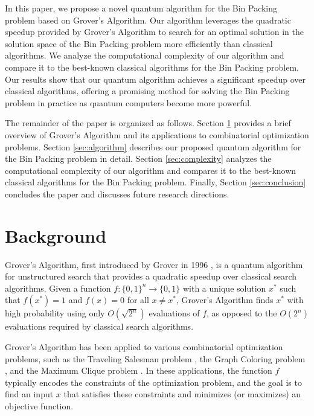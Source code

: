 In this paper, we propose a novel quantum algorithm for the Bin Packing problem based on Grover's Algorithm. Our algorithm leverages the quadratic speedup provided by Grover's Algorithm to search for an optimal solution in the solution space of the Bin Packing problem more efficiently than classical algorithms. We analyze the computational complexity of our algorithm and compare it to the best-known classical algorithms for the Bin Packing problem. Our results show that our quantum algorithm achieves a significant speedup over classical algorithms, offering a promising method for solving the Bin Packing problem in practice as quantum computers become more powerful.

The remainder of the paper is organized as follows. Section \ref{sec:background} provides a brief overview of Grover's Algorithm and its applications to combinatorial optimization problems. Section \ref{sec:algorithm} describes our proposed quantum algorithm for the Bin Packing problem in detail. Section \ref{sec:complexity} analyzes the computational complexity of our algorithm and compares it to the best-known classical algorithms for the Bin Packing problem. Finally, Section \ref{sec:conclusion} concludes the paper and discusses future research directions.

\section{Background}\label{sec:background}
Grover's Algorithm, first introduced by Grover in 1996 \cite{grover1996fast}, is a quantum algorithm for unstructured search that provides a quadratic speedup over classical search algorithms. Given a function $f: \{0, 1\}^n \rightarrow \{0, 1\}$ with a unique solution $x^*$ such that $f(x^*) = 1$ and $f(x) = 0$ for all $x \neq x^*$, Grover's Algorithm finds $x^*$ with high probability using only $O\left(\sqrt{2^n}\right)$ evaluations of $f$, as opposed to the $O\left(2^n\right)$ evaluations required by classical search algorithms.

Grover's Algorithm has been applied to various combinatorial optimization problems, such as the Traveling Salesman problem \cite{zalka1999grover}, the Graph Coloring problem \cite{childs2002quantum}, and the Maximum Clique problem \cite{ambainis2007quantum}. In these applications, the function $f$ typically encodes the constraints of the optimization problem, and the goal is to find an input $x$ that satisfies these constraints and minimizes (or maximizes) an objective function.


